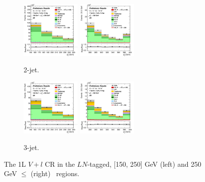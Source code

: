 \begin{figure}[h!]
    \centering
    \begin{subfigure}[b]{\textwidth}
        \centering
        \includegraphics[width=0.32\textwidth]{Images/VH/Own_fit/prefit_VHcc/Region_distpTV_BMax250_BMin150_DSR_J2_TTypeln_T1_L1_Y6051_Prefit.png}
        \includegraphics[width=0.32\textwidth]{Images/VH/Own_fit/prefit_VHcc/Region_distpTV_BMin250_DSR_J2_TTypeln_T1_L1_Y6051_Prefit.png}
        \caption{2-jet.}
        \label{fig:plots_VHcc_1L_LN_2J}
    \end{subfigure}
    \begin{subfigure}[b]{\textwidth}
        \centering
        \includegraphics[width=0.32\textwidth]{Images/VH/Own_fit/prefit_VHcc/Region_distpTV_BMax250_BMin150_DSR_J3_TTypeln_T1_L1_Y6051_Prefit.png}
        \includegraphics[width=0.32\textwidth]{Images/VH/Own_fit/prefit_VHcc/Region_distpTV_BMin250_DSR_J3_TTypeln_T1_L1_Y6051_Prefit.png}
        \caption{3-jet.}
        \label{fig:plots_VHcc_1L_SR_3J}
    \end{subfigure}
    \caption{The 1L $V+l$ CR in the $LN$-tagged, [150, 250] GeV (left) and 250  GeV $\leq$ (right) \ptv\ regions.}
    \label{fig:plots_VHcc_1L_LN}
\end{figure}

